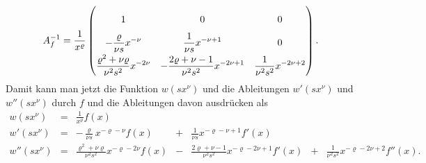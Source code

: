 \[
A_f^{-1}
=
\renewcommand{\arraystretch}{2.0}
\frac{1}{x^\varrho}
\begin{pmatrix}
\displaystyle 1
	& 0
		& 0
\\
\displaystyle-\frac{\varrho}{\nu s} x^{-\nu}
	&\displaystyle \frac{1}{\nu s} x^{-\nu+1}
		& 0
\\
\displaystyle\frac{\varrho^2+\nu\varrho}{\nu^2s^2}x^{-2\nu}
	&\displaystyle -\frac{2\varrho+\nu-1}{\nu^2s^2} x^{-2\nu+1}
		&\displaystyle \frac{1}{\nu^2s^2} x^{-2\nu+2}
\end{pmatrix}.
\] 
Damit kann man jetzt die Funktion $w(sx^\nu)$ und die Ableitungen
$w'(sx^\nu)$ und $w''(sx^\nu)$ durch $f$ und die Ableitungen davon
ausdrücken als
\begin{equation}
\renewcommand{\arraystretch}{2.3}
\renewcommand\arraycolsep{2pt}
\begin{array}{rcrcrcr}
w(sx^\nu)
	&=& \displaystyle \frac{1}{x^\varrho} f(x)
	& & 
	& &
\\
w'(sx^\nu)
	&=& \displaystyle -\frac{\varrho}{\nu s} x^{-\varrho-\nu} f(x)
	&+& \displaystyle \frac{1}{\nu s}x^{-\varrho-\nu+1} f'(x)
	& &
\\
w''(sx^\nu)
	&=& \displaystyle \frac{\varrho^2+\nu\varrho}{\nu^2 s^2}x^{-\varrho-2\nu} f(x)
	&-& \displaystyle \frac{2\varrho+\nu-1}{\nu^2s^2} x^{-\varrho-2\nu+1} f'(x)
	&+& \displaystyle \frac{1}{\nu^2 s^2} x^{-\varrho-2\nu+2} f''(x).
\end{array}
\label{buch:differentialgleichungen:hypergeometrisch:wsubst}
\end{equation}
